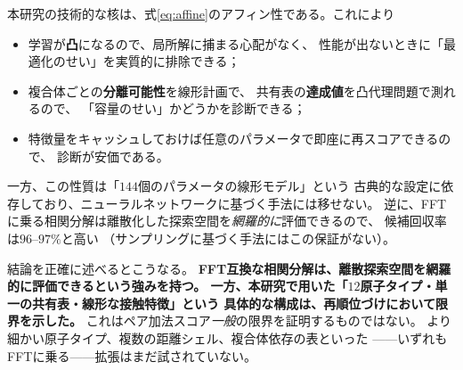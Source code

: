\documentclass[11pt,a4paper]{article}
\begin{document}
本研究の技術的な核は、式\eqref{eq:affine}のアフィン性である。これにより
\begin{itemize}
  \item 学習が\textbf{凸}になるので、局所解に捕まる心配がなく、
        性能が出ないときに「最適化のせい」を実質的に排除できる；
  \item 複合体ごとの\textbf{分離可能性}を線形計画で、
        共有表の\textbf{達成値}を凸代理問題で測れるので、
        「容量のせい」かどうかを診断できる；
  \item 特徴量をキャッシュしておけば任意のパラメータで即座に再スコアできるので、
        診断が安価である。
\end{itemize}

一方、この性質は「$144$個のパラメータの線形モデル」という
古典的な設定に依存しており、ニューラルネットワークに基づく手法には移せない。
逆に、FFTに乗る相関分解は離散化した探索空間を\emph{網羅的に}評価できるので、
候補回収率は$96$--$97\%$と高い
（サンプリングに基づく手法にはこの保証がない）。

結論を正確に述べるとこうなる。
\textbf{FFT互換な相関分解は、離散探索空間を網羅的に評価できるという強みを持つ。
一方、本研究で用いた「$12$原子タイプ・単一の共有表・線形な接触特徴」という
具体的な構成は、再順位づけにおいて限界を示した。}
これはペア加法スコア\emph{一般}の限界を証明するものではない。
より細かい原子タイプ、複数の距離シェル、複合体依存の表といった
——いずれもFFTに乗る——拡張はまだ試されていない。
\end{document}
